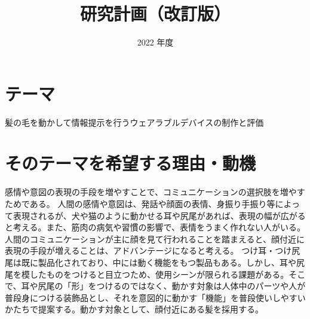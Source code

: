 \documentclass[a4paper]{jsarticle}
\begin{document}
\masterthesis %


\title{研究計画（改訂版）}
\date{2022 年度}
\maketitle


\setcounter{page}{1} %



\newpage

\setcounter{page}{1} %


\section{テーマ}
髪の毛を動かして情報提示を行うウェアラブルデバイスの制作と評価

\section{そのテーマを希望する理由・動機}
感情や意図の表現の手段を増やすことで、コミュニケーションの選択肢を増やすためである。
人間の感情や意図は、発話や顔面の表情、身振り手振り等によって表現されるが、犬や猫のように動かせる耳や尻尾があれば、表現の幅が広がると考える。また、筋肉の病気や習慣の影響で、表情をうまく作れない人がいる。人間のコミュニケーションが主に顔を見て行われることを踏まえると、顔付近に表現の手段が増えることは、アドバンテージになると考える。
つけ耳・つけ尻尾は既に製品化されており、中には動く機能をもつ製品もある。しかし、耳や尻尾を模したものをつけると目立つため、使用シーンが限られる課題がある。そこで、耳や尻尾の「形」をつけるのではなく、動かす対象は人体中のパーツや人が普段身につける装飾品とし、それを意図的に動かす「機能」を普段使いしやすいかたちで提案する。動かす対象として、顔付近にある髪を採用する。
\end{document}
